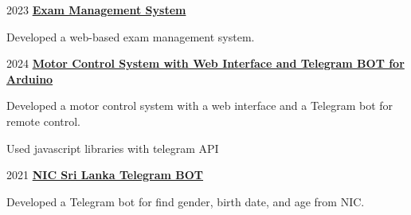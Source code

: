 \vspace{0.3 cm}

\begin{twocolentry}{
      2023
   }
   \textbf{\href{https://github.com/ShanelkaPramuditha/oop-project-ems-portal}{\textcolor{secondaryColor}{Exam Management System}}}
   \begin{highlights}
      \item Developed a web-based exam management system.
   \end{highlights}
\end{twocolentry}

\vspace{0.3 cm}

\begin{twocolentry}{
      2024
   }
   \textbf{\href{https://github.com/ShanelkaPramuditha/arduino-motor-controller-system}{\textcolor{secondaryColor}{Motor Control System with Web Interface and Telegram BOT for Arduino}}}
   \begin{highlights}
      \item Developed a motor control system with a web interface and a Telegram bot for remote control.
      \item Used javascript libraries with telegram API
   \end{highlights}
\end{twocolentry}

\vspace{0.3 cm}

\begin{twocolentry}{
      2021
   }
   \textbf{\href{https://github.com/ShanelkaPramuditha/NIC-Sri-Lanka-BOT}{\textcolor{secondaryColor}{NIC Sri Lanka Telegram BOT}}}
   \begin{highlights}
      \item Developed a Telegram bot for find gender, birth date, and age from NIC.
   \end{highlights}
\end{twocolentry}